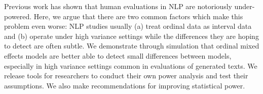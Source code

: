 Previous work has shown that human evaluations  in  NLP  are  notoriously  under-powered. Here,  we  argue  that  there  are  two  common factors which make this problem even worse: NLP studies usually (a) treat ordinal data as interval data and (b) operate under high variance settings while the differences they are hoping to  detect  are  often  subtle.  We  demonstrate through simulation that ordinal mixed effects models  are  better  able  to  detect  small  differences between models, especially in high variance settings common in evaluations of generated texts.  We release tools for researchers to conduct their own power analysis and test their assumptions. We also make recommendations for improving statistical power.
